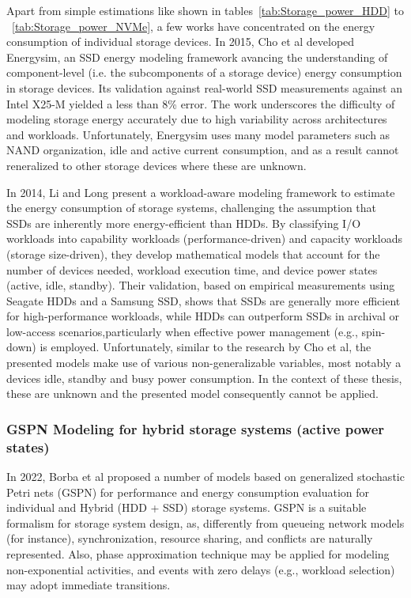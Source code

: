 Apart from simple estimations like shown in tables~\ref{tab:Storage_power_HDD} to ~\ref{tab:Storage_power_NVMe}, a few works have concentrated on the energy consumption of individual storage devices. In 2015, Cho et al developed Energysim\parencite{choDesignTradeoffsSSDs2015}, an SSD energy modeling framework avancing the understanding of component-level (i.e. the subcomponents of a storage device) energy consumption in storage devices. Its validation against real-world SSD measurements against an Intel X25-M yielded a less than 8\% error. The work underscores the difficulty of modeling storage energy accurately due to high variability across architectures and workloads. Unfortunately, Energysim uses many model parameters such as NAND organization, idle and active current consumption, and as a result cannot reneralized to other storage devices where these are unknown.

In 2014, Li and Long\parencite{liWhichStorageDevice2014} present a workload-aware modeling framework to estimate the energy consumption of storage systems, challenging the assumption that SSDs are inherently more energy-efficient than HDDs. By classifying I/O workloads into capability workloads (performance-driven) and capacity workloads (storage size-driven), they develop mathematical models that account for the number of devices needed, workload execution time, and device power states (active, idle, standby). Their validation, based on empirical measurements using Seagate HDDs and a Samsung SSD, shows that SSDs are generally more efficient for high-performance workloads, while HDDs can outperform SSDs in archival or low-access scenarios,particularly when effective power management (e.g., spin-down) is employed. Unfortunately, similar to the research by Cho et al, the presented models make use of various non-generalizable variables, most notably a devices idle, standby and busy power consumption. In the context of these thesis, these are unknown and the presented model consequently cannot be applied.

\subsubsection{GSPN Modeling for hybrid storage systems (active power states)}
In 2022, Borba et al\parencite{borbaModelingApproachEstimating2022} proposed a number of models based on generalized stochastic Petri nets (GSPN) for performance and energy consumption evaluation for individual and Hybrid (HDD + SSD) storage systems. GSPN is a suitable formalism for storage system design, as, differently from queueing network models (for instance), synchronization, resource sharing, and conflicts are naturally represented. Also, phase approximation technique may be applied for modeling non-exponential activities, and events with zero delays (e.g., workload selection) may adopt immediate transitions. 


